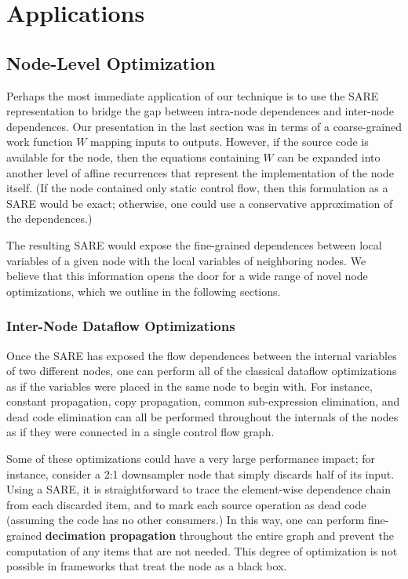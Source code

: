 \section{Applications}

\subsection{Node-Level Optimization}

Perhaps the most immediate application of our technique is to use the
SARE representation to bridge the gap between intra-node dependences
and inter-node dependences.  Our presentation in the last section was
in terms of a coarse-grained work function $W$ mapping inputs to
outputs.  However, if the source code is available for the node, then
the equations containing $W$ can be expanded into another level of
affine recurrences that represent the implementation of the node
itself.  (If the node contained only static control flow, then this
formulation as a SARE would be exact; otherwise, one could use a
conservative approximation of the dependences.)

The resulting SARE would expose the fine-grained dependences between
local variables of a given node with the local variables of
neighboring nodes.  We believe that this information opens the door
for a wide range of novel node optimizations, which we outline in the
following sections.

\subsubsection{Inter-Node Dataflow Optimizations}

Once the SARE has exposed the flow dependences between the internal
variables of two different nodes, one can perform all of the classical
dataflow optimizations as if the variables were placed in the same
node to begin with.  For instance, constant propagation, copy
propagation, common sub-expression elimination, and dead code
elimination can all be performed throughout the internals of the nodes
as if they were connected in a single control flow graph.

Some of these optimizations could have a very large performance
impact; for instance, consider a 2:1 downsampler node that simply
discards half of its input.  Using a SARE, it is straightforward to
trace the element-wise dependence chain from each discarded item, and
to mark each source operation as dead code (assuming the code has no
other consumers.)  In this way, one can perform fine-grained {\bf
decimation propagation} throughout the entire graph and prevent the
computation of any items that are not needed.  This degree of
optimization is not possible in frameworks that treat the node as a
black box.


